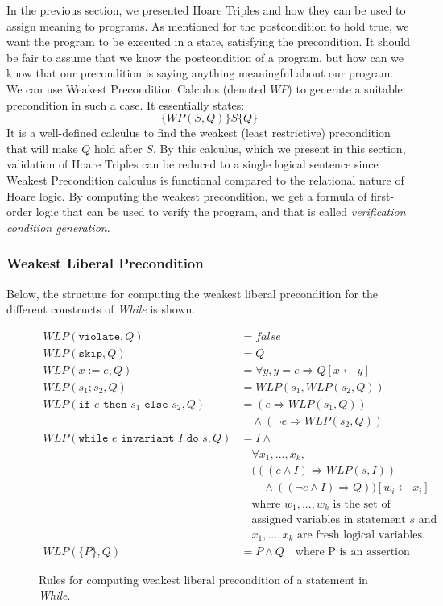 In the previous section, we presented Hoare Triples and how they can be used to assign meaning to programs. As mentioned for the postcondition to hold true, we want the program to be executed in a state, satisfying the precondition. It should be fair to assume that we know the postcondition of a program, but how can we know that our precondition is saying anything meaningful about our program. We can use Weakest Precondition Calculus (denoted $WP$) to generate a suitable precondition in such a case.
It essentially states:
$$
\{WP(S,Q)\}S\{Q\}
$$
It is a well-defined calculus to find the weakest (least restrictive) precondition that will make $Q$ hold after $S$. By this calculus, which we present in this section, validation of Hoare Triples can be reduced to a single logical sentence since Weakest Precondition calculus is functional compared to the relational nature of Hoare logic.
By computing the weakest precondition, we get a formula of first-order logic that can be used to verify the program, and that is called \textit{verification condition generation}.

\subsubsection{Weakest Liberal Precondition}
Below, the structure for computing the weakest liberal precondition for the different constructs of \textit{While} is shown.

\begin{figure}
\begin{align*}
WLP(\texttt{violate}, Q) &= false \\
WLP(\texttt{skip}, Q) &= Q \\
WLP(x:=e,Q) &= \forall y, y = e \Rightarrow Q[x \leftarrow y] \\
WLP(s_1;s_2, Q) &= WLP(s_1, WLP(s_2, Q)) \\
WLP(\texttt{if } e \texttt{ then } s_1 \texttt{ else } s_2, Q) &= (e \Rightarrow WLP(s_1, Q)) \\
    &\quad \land (\neg e \Rightarrow WLP(s_2, Q)) \\
WLP(\texttt{while } e \texttt{ invariant } I \texttt{ do } s, Q) &= 
    I \land \\
&\quad \forall x_1, ..., x_k, \\
&\quad (((e \land I) \Rightarrow WLP(s, I)) \\
&\quad \quad \land (( \neg e \land I) \Rightarrow Q))
    [w_i \leftarrow x_i] \\
&\quad \text{where } w_1, ..., w_k \text{ is the set of} \\
&\quad \text{assigned variables in statement } s \text{ and } \\
&\quad x_1, ..., x_k \text{ are fresh logical variables.} \\
WLP(\{P\}, Q) &= P \land Q \quad \text{where P is an assertion}
\end{align*}
\caption{Rules for computing weakest liberal precondition of a statement in \textit{While}.}
\label{fig:wlp}
\end{figure}

